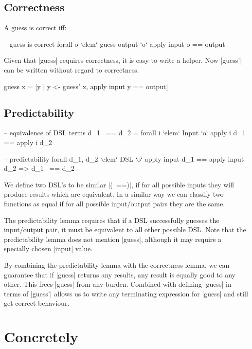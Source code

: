 \documentclass[preprint]{sigplanconf}
\begin{document}
\subsection{Correctness}

A guess is correct iff:

\ignore\begin{code}
-- guess is correct
forall o `elem` guess output `o` apply input o == output
\end{code}

Given that |guess| requires correctness, it is easy to write a helper. Now |guess'| can be written without regard to correctness.

\begin{code}
guess x = [y | y <- guess' x, apply input y == output]
\end{code}

\subsection{Predictability}

\ignore\begin{code}
-- equivalence of DSL terms
d_1 ~== d_2 = forall i `elem` Input `o` apply i d_1 == apply i d_2

-- predictability
forall d_1, d_2 `elem` DSL `o` apply input d_1 == apply input d_2 => d_1 ~== d_2
\end{code}

We define two DSL's to be similar  |(~==)|, if for all possible inputs they will produce results which are equivalent. In a similar way we can classify two functions as equal if for all possible input/output pairs they are the same.

The predictability lemma requires that if a DSL successfully guesses the input/output pair, it must be equivalent to all other possible DSL. Note that the predictability lemma does not mention |guess|, although it may require a specially chosen |input| value.

By combining the predictability lemma with the correctness lemma, we can guarantee that if |guess| returns any results, any result is equally good to any other. This frees |guess| from any burden. Combined with defining |guess| in terms of |guess'| allows us to write any terminating expression for |guess| and still get correct behaviour.

\section{Concretely}
\end{document}
